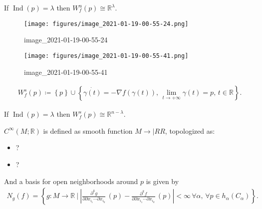 \begin{lemma}[?]

If \(\mathop{\mathrm{Ind}}(p) = \lambda\) then
\(W_f^u(p) \cong {\mathbb{R}}^ \lambda\).

\end{lemma}

\begin{example}[?]

\begin{figure}
\centering
\texttt{[image: figures/image\_2021-01-19-00-55-24.png]}
\caption{image\_2021-01-19-00-55-24}
\end{figure}

\end{example}

\begin{example}[?]

\begin{figure}
\centering
\texttt{[image: figures/image\_2021-01-19-00-55-41.png]}
\caption{image\_2021-01-19-00-55-41}
\end{figure}

\end{example}

\begin{definition}

\begin{align*}
W_f^s(p) \coloneqq\left\{{p}\right\} \cup\left\{{
\dot{\gamma(t)} = -\nabla f(\gamma(t)),\, \lim_{t\to +\infty} \gamma(t) = p,\, t\in {\mathbb{R}}
}\right\}
.\end{align*}

\end{definition}

\begin{lemma}[?]

If \(\mathop{\mathrm{Ind}}(p) = \lambda\) then
\(W_f^s(p) \cong {\mathbb{R}}^{n- \lambda}\).

\end{lemma}

\begin{definition}[$C^\infty$ ]

\(C^ \infty (M; {\mathbb{R}})\) is defined as smooth function
\(M\to |RR\), topologized as:

\begin{itemize}
\tightlist
\item
  ?
\item
  ?
\end{itemize}

And a basis for open neighborhoods around \(p\) is given by
\begin{align*}
N_g(f) = \left\{{
g:M\to {\mathbb{R}}{~\mathrel{\Big|}~}
{\left\lvert {
{\frac{\partial ^k g}{\partial {\partial}x _{i_1} \cdots {\partial}x _{i_k} }\,}(p)
- 
{\frac{\partial ^k f}{\partial {\partial}x _{i_1} \cdots {\partial}x _{i_k} }\,}(p)
} \right\rvert} < \infty\, \forall \alpha,\, \forall p\in h_ \alpha(C_ \alpha)
}\right\}
.\end{align*}

\end{definition}

